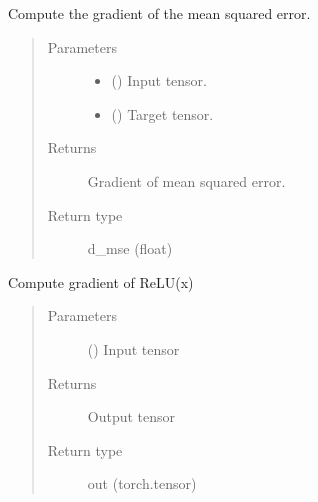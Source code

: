 \documentclass[letterpaper,10pt,english,openany,oneside]{sphinxmanual}
\begin{document}
\begin{fulllineitems}
\label{\detokenize{nn:nn.functional.d_mse}}
Compute the gradient of the mean squared error.
\begin{quote}\begin{description}
\item[{Parameters}] \leavevmode\begin{itemize}
\item {} 
 () \textendash{} Input tensor.

\item {} 
 () \textendash{} Target tensor.

\end{itemize}

\item[{Returns}] \leavevmode
Gradient of mean squared error.

\item[{Return type}] \leavevmode
d\_mse (float)

\end{description}\end{quote}

\end{fulllineitems}


\begin{fulllineitems}
\label{\detokenize{nn:nn.functional.d_relu}}
Compute gradient of ReLU(x)
\begin{quote}\begin{description}
\item[{Parameters}] \leavevmode
{} () \textendash{} Input tensor

\item[{Returns}] \leavevmode
Output tensor

\item[{Return type}] \leavevmode
out (torch.tensor)

\end{description}\end{quote}

\end{fulllineitems}
\end{document}
